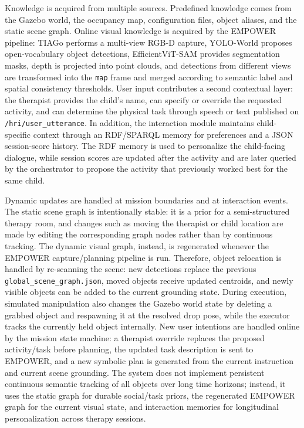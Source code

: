 Knowledge is acquired from multiple sources. Predefined knowledge comes from the Gazebo world, the occupancy map, configuration files, object aliases, and the static scene graph. Online visual knowledge is acquired by the EMPOWER pipeline: TIAGo performs a multi-view RGB-D capture, YOLO-World proposes open-vocabulary object detections, EfficientViT-SAM provides segmentation masks, depth is projected into point clouds, and detections from different views are transformed into the \texttt{map} frame and merged according to semantic label and spatial consistency thresholds. User input contributes a second contextual layer: the therapist provides the child's name, can specify or override the requested activity, and can determine the physical task through speech or text published on \texttt{/hri/user\_utterance}. In addition, the interaction module maintains child-specific context through an RDF/SPARQL memory for preferences and a JSON session-score history. The RDF memory is used to personalize the child-facing dialogue, while session scores are updated after the activity and are later queried by the orchestrator to propose the activity that previously worked best for the same child.

Dynamic updates are handled at mission boundaries and at interaction events. The static scene graph is intentionally stable: it is a prior for a semi-structured therapy room, and changes such as moving the therapist or child location are made by editing the corresponding graph nodes rather than by continuous tracking. The dynamic visual graph, instead, is regenerated whenever the EMPOWER capture/planning pipeline is run. Therefore, object relocation is handled by re-scanning the scene: new detections replace the previous \texttt{global\_scene\_graph.json}, moved objects receive updated centroids, and newly visible objects can be added to the current grounding state. During execution, simulated manipulation also changes the Gazebo world state by deleting a grabbed object and respawning it at the resolved drop pose, while the executor tracks the currently held object internally. New user intentions are handled online by the mission state machine: a therapist override replaces the proposed activity/task before planning, the updated task description is sent to EMPOWER, and a new symbolic plan is generated from the current instruction and current scene grounding. The system does not implement persistent continuous semantic tracking of all objects over long time horizons; instead, it uses the static graph for durable social/task priors, the regenerated EMPOWER graph for the current visual state, and interaction memories for longitudinal personalization across therapy sessions.
